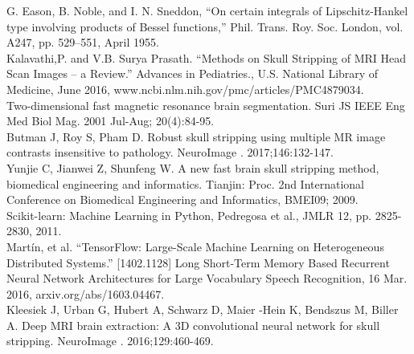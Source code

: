 \documentclass[conference]{IEEEtran}
\begin{document}
\begin{thebibliography}{00}
 G. Eason, B. Noble, and I. N. Sneddon, ``On certain integrals of Lipschitz-Hankel type involving products of Bessel functions,'' Phil. Trans. Roy. Soc. London, vol. A247, pp. 529--551, April 1955.\\
 Kalavathi,P. and V.B. Surya Prasath. ``Methods on Skull Stripping of MRI Head Scan Images -- a Review.'' Advances in Pediatries., U.S. National Library of Medicine, June 2016, www.ncbi.nlm.nih.gov/pmc/articles/PMC4879034.\\
 Two-dimensional fast magnetic resonance brain segmentation. Suri JS IEEE Eng Med Biol Mag. 2001 Jul-Aug; 20(4):84-95.\\
 Butman J, Roy S, Pham D. Robust skull stripping using multiple MR image contrasts insensitive to pathology. NeuroImage . 2017;146:132-147.\\
 Yunjie C, Jianwei Z, Shunfeng W. A new fast brain skull stripping method, biomedical engineering and informatics. Tianjin: Proc. 2nd International Conference on Biomedical Engineering and Informatics, BMEI09; 2009.\\
 Scikit-learn: Machine Learning in Python, Pedregosa et al., JMLR 12, pp. 2825-2830, 2011.\\
 Martín, et al. “TensorFlow: Large-Scale Machine Learning on Heterogeneous Distributed Systems.” [1402.1128] Long Short-Term Memory Based Recurrent Neural Network Architectures for Large Vocabulary Speech Recognition, 16 Mar. 2016, arxiv.org/abs/1603.04467.\\
 Kleesiek J, Urban G, Hubert A, Schwarz D, Maier -Hein K, Bendszus M, Biller A. Deep MRI brain extraction: A 3D convolutional neural network for skull stripping. NeuroImage . 2016;129:460-469.

\end{thebibliography}
\end{document}
